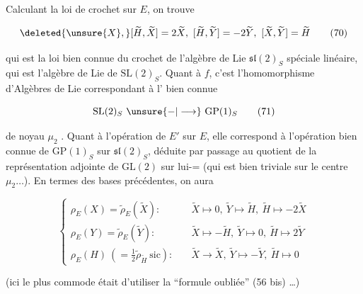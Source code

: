 Calculant la loi de crochet sur $E$, on trouve

\[
\deleted{\unsure{X},}[\widetilde H,\widetilde X]=2\widetilde X,\ [\widetilde H,\widetilde Y]=-2\widetilde Y,\ [\widetilde X,\widetilde Y]=\widetilde H \tag*{(70)}
\]

qui est la loi bien connue du crochet de l'algèbre de Lie $\mathfrak{sl}(2)_S$ spéciale linéaire, qui est l'algèbre de Lie de $\mathrm{SL}(2)_S$. Quant à $f$, c'est l'homomorphisme d'Algèbres de Lie correspondant à l'  bien connue

\[
\mathrm{SL}(2)_S\ \unsure{\mathbin{-}|\longrightarrow}\ \mathrm{GP}(1)_S \tag*{(71)}
\]

 de noyau $\mu_2$ . Quant à l'opération de $E'$ sur $E$, elle correspond à l'opération bien connue de $\mathrm{GP}(1)_S$ sur $\mathfrak{sl}(2)_S$, déduite par passage au quotient de la représentation adjointe de $\mathrm{GL}(2)$ sur lui-= (qui est bien triviale sur le centre $\mu_2\ldots$). En termes des bases précédentes, on aura


\[
\left\{\begin{aligned}
\rho_E(X)=\widetilde\rho_E(\widetilde X):\quad&
\widetilde X\mapsto0,\ \widetilde Y\longmapsto\widetilde H,\ \widetilde H\longmapsto-2\widetilde X\\
\rho_E(Y)=\widetilde\rho_E(\widetilde Y):\quad&
\widetilde X\mapsto-\widetilde H,\ \widetilde Y\mapsto0,\ \widetilde H\mapsto2\widetilde Y\\
\rho_E(H)\ (=\tfrac12\widetilde\rho_{\widetilde H}\ \text{sic}):\quad&
\widetilde X\to\widetilde X,\ \widetilde Y\mapsto-\widetilde Y,\ \widetilde H\mapsto0
\end{aligned}\right. \tag*{(72)}
\]

(ici le plus commode était d'utiliser la ``formule oubliée'' (56 bis) \ldots)

